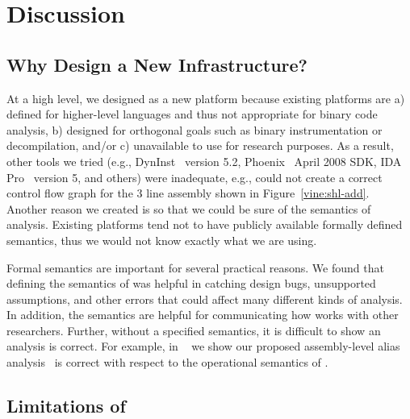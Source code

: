 \section{Discussion}
\label{vine:discussion}

\subsection{Why Design a New Infrastructure?}  

At a high level, we designed \bap as a new platform because existing
platforms are a) defined for higher-level languages and thus not
appropriate for binary code analysis, b) designed for orthogonal goals
such as binary instrumentation or decompilation, and/or c) unavailable
to use for research purposes.  As a result, other tools we tried
(e.g., DynInst~\cite{dyninst} version 5.2, Phoenix~\cite{phoenix}
April 2008 SDK, IDA Pro~\cite{idapro} version 5, and others) were
inadequate, e.g., could not create a correct control flow graph for
the 3 line assembly shown in Figure~\ref{vine:shl-add}. Another reason
we created \bap is so that we could be sure of the semantics of 
analysis. Existing platforms tend not to have publicly available
formally defined semantics, thus we would not know exactly what we are
using.

Formal semantics are important for several practical reasons. We found
that defining the semantics of \bap was helpful in catching design
bugs, unsupported assumptions, and other errors that could affect many
different kinds of analysis. In addition, the semantics are helpful
for communicating how \bap works with other researchers.  Further,
without a specified semantics, it is difficult to show an analysis is
correct. For example, in ~\cite{brumley:2006:alias} we show our
proposed assembly-level alias analysis~\cite{brumley:2006:alias} is
correct with respect to the operational semantics of \bap.


\subsection{Limitations of \bap}

